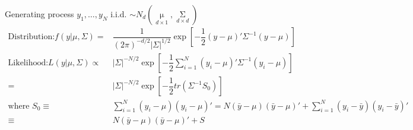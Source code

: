 Generating process $ y_1,\ldots,y_N $ i.i.d. $ \sim N_d(\mathop{\mu }\limits_{d\times 1}  ,\mathop{\Sigma }\limits_{d\times d} ) $
\begin{align*}
    \text{Distribution:}f(y|\mu ,\Sigma )=&\dfrac{1}{(2\pi)^{-d/2}|\Sigma |^{1/2}}\exp\left[ -\dfrac{1}{2}(y-\mu )'\Sigma ^{-1}(y-\mu ) \right]\\
    \text{Likelihood:}L(y|\mu ,\Sigma )\propto& |\Sigma |^{-N/2}\exp\left[ -\dfrac{1}{2}\sum_{i=1}^N (y_i-\mu )'\Sigma ^{-1}(y_i-\mu ) \right]\\
    =& |\Sigma |^{-N/2}\exp\left[ -\dfrac{1}{2}tr\left(\Sigma ^{-1}S_0
     \right)\right]\\
    \text{where }S_0\equiv &\sum_{i=1}^N(y_i-\mu )(y_i-\mu )'=N(\bar{y}-\mu )(\bar{y}-\mu )'+\sum_{i=1}^N(y_i-\bar{y})(y_i-\bar{y})'\\
    \equiv& N(\bar{y}-\mu )(\bar{y}-\mu )'+S
\end{align*}


